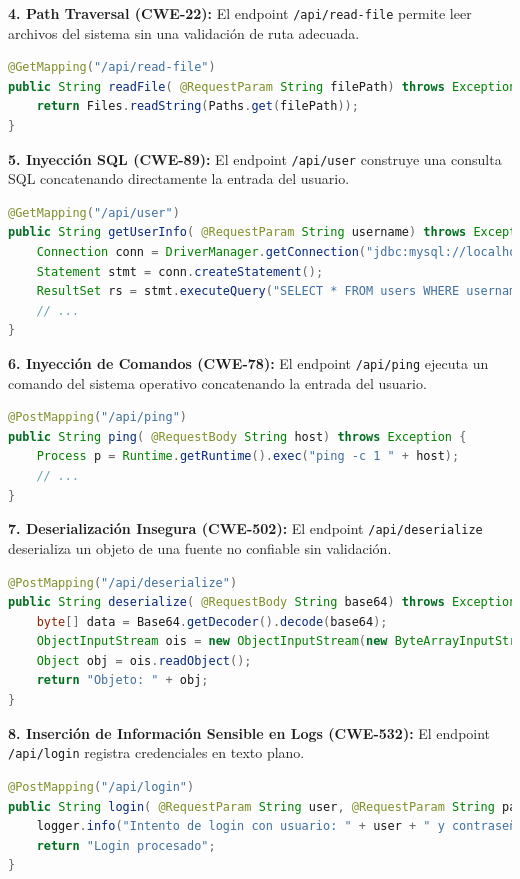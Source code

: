 \textbf{4. Path Traversal (CWE-22):} El endpoint \texttt{/api/read-file} permite leer archivos del sistema sin una validación de ruta adecuada.
\begin{lstlisting}[language=java, caption={Código vulnerable a Path Traversal.}]
@GetMapping("/api/read-file")
public String readFile( @RequestParam String filePath) throws Exception {
    return Files.readString(Paths.get(filePath));
}
\end{lstlisting}

\textbf{5. Inyección SQL (CWE-89):} El endpoint \texttt{/api/user} construye una consulta SQL concatenando directamente la entrada del usuario.
\begin{lstlisting}[language=java, caption={Código vulnerable a Inyección SQL.}]
@GetMapping("/api/user")
public String getUserInfo( @RequestParam String username) throws Exception {
    Connection conn = DriverManager.getConnection("jdbc:mysql://localhost:3306/demo", "root", DB_PASSWORD);
    Statement stmt = conn.createStatement();
    ResultSet rs = stmt.executeQuery("SELECT * FROM users WHERE username = '" + username + "'");
    // ...
}
\end{lstlisting}

\textbf{6. Inyección de Comandos (CWE-78):} El endpoint \texttt{/api/ping} ejecuta un comando del sistema operativo concatenando la entrada del usuario.
\begin{lstlisting}[language=java, caption={Código vulnerable a Inyección de Comandos.}]
@PostMapping("/api/ping")
public String ping( @RequestBody String host) throws Exception {
    Process p = Runtime.getRuntime().exec("ping -c 1 " + host);
    // ...
}
\end{lstlisting}

\textbf{7. Deserialización Insegura (CWE-502):} El endpoint \texttt{/api/deserialize} deserializa un objeto de una fuente no confiable sin validación.
\begin{lstlisting}[language=java, caption={Código vulnerable a Deserialización Insegura.}]
@PostMapping("/api/deserialize")
public String deserialize( @RequestBody String base64) throws Exception {
    byte[] data = Base64.getDecoder().decode(base64);
    ObjectInputStream ois = new ObjectInputStream(new ByteArrayInputStream(data));
    Object obj = ois.readObject();
    return "Objeto: " + obj;
}
\end{lstlisting}

\textbf{8. Inserción de Información Sensible en Logs (CWE-532):} El endpoint \texttt{/api/login} registra credenciales en texto plano.
\begin{lstlisting}[language=java, caption={Logs con información sensible.}]
@PostMapping("/api/login")
public String login( @RequestParam String user, @RequestParam String password) {
    logger.info("Intento de login con usuario: " + user + " y contraseña: " + password); // Log inseguro
    return "Login procesado";
}
\end{lstlisting}

